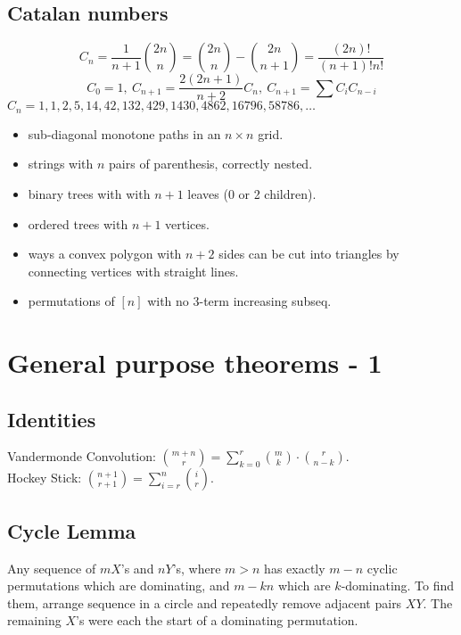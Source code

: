 	\subsection{Catalan numbers}
		\[ C_n=\frac{1}{n+1}\binom{2n}{n}= \binom{2n}{n}-\binom{2n}{n+1} = \frac{(2n)!}{(n+1)!n!} \]
		\[ C_0=1,\ C_{n+1} = \frac{2(2n+1)}{n+2}C_n,\ C_{n+1}=\sum C_iC_{n-i} \]
		${C_n = 1, 1, 2, 5, 14, 42, 132, 429, 1430, 4862, 16796, 58786, \dots}$
		\begin{itemize}[noitemsep]
			\item sub-diagonal monotone paths in an $n\times n$ grid.
			\item strings with $n$ pairs of parenthesis, correctly nested.
			\item binary trees with with $n+1$ leaves (0 or 2 children).
			\item ordered trees with $n+1$ vertices.
			\item ways a convex polygon with $n+2$ sides can be cut into triangles by connecting vertices with straight lines.
			\item permutations of $[n]$ with no 3-term increasing subseq.
		\end{itemize}
 \section{General purpose theorems - 1}
    \subsection{Identities}
    Vandermonde Convolution: $\binom{m+n}{r} = \sum_{k=0}^r\binom{m}{k}\cdot\binom{r}{n-k}$.\\
    Hockey Stick: $\binom{n+1}{r+1} = \sum_{i=r}^n\binom{i}{r}$.\\

    \subsection{Cycle Lemma}
    Any sequence of $m X$'s and $n Y$'s, where $m > n$ has exactly $m -n$ cyclic permutations which are dominating,
    and $m - kn$ which are $k$-dominating. To find them, arrange sequence in a circle and repeatedly remove
    adjacent pairs $XY$. The remaining $X$'s were each the start of a dominating permutation.

